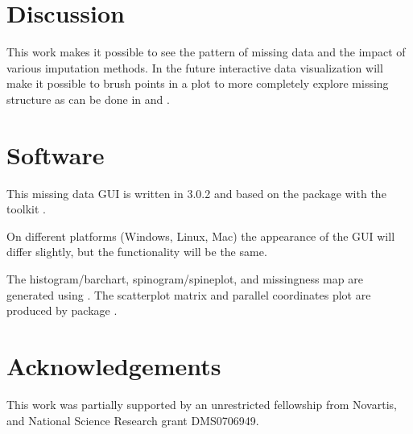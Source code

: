 \documentclass[article]{jss}
\begin{document}
\section{Discussion}

This work makes it possible to see the pattern of missing data and the impact of various imputation methods. In the future interactive data visualization will make it possible to brush points in a plot to more completely explore missing structure as can be done in  and .


\section*{Software}

This missing data GUI is written in  3.0.2 \citep{r} and based on the package  \citep{gwidgets} with the toolkit . 

On different platforms (Windows, Linux, Mac) the appearance of the GUI will differ slightly, but the functionality will be the same.

The histogram/barchart, spinogram/spineplot, and missingness map are generated using  \citep{ggplot2}.
The scatterplot matrix and parallel coordinates plot are produced by package  \citep{ggally}.

\section*{Acknowledgements}

This work was partially supported by an unrestricted fellowship from Novartis, and National Science Research grant DMS0706949.


\end{document}
